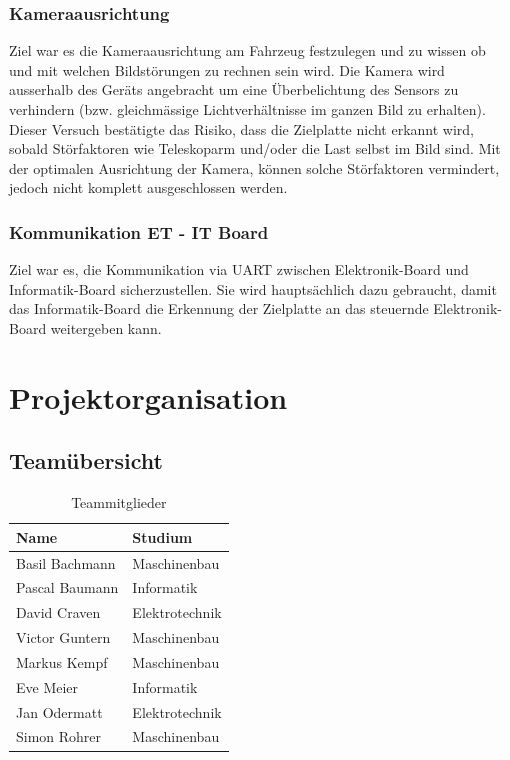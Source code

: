\documentclass[a4paper]{report}
\begin{document}
\subsection{Kameraausrichtung}
\label{ssec:VersKamera}
Ziel war es die Kameraausrichtung am Fahrzeug festzulegen und zu wissen ob und mit welchen Bildstörungen zu rechnen sein wird.
Die Kamera wird ausserhalb des Geräts angebracht um eine Überbelichtung des Sensors zu verhindern (bzw. gleichmässige Lichtverhältnisse im ganzen Bild zu erhalten).
Dieser Versuch bestätigte das Risiko, dass die Zielplatte nicht erkannt wird, sobald Störfaktoren wie Teleskoparm und/oder die Last selbst im Bild sind.  Mit der optimalen Ausrichtung der Kamera, können solche Störfaktoren vermindert, jedoch nicht komplett ausgeschlossen werden.

\subsection{Kommunikation ET - IT Board}
\label{ssec:VersKomm}
Ziel war es, die Kommunikation via UART zwischen Elektronik-Board und Informatik-Board sicherzustellen. Sie wird hauptsächlich dazu gebraucht, damit das Informatik-Board die Erkennung der Zielplatte an das steuernde Elektronik-Board weitergeben kann.


\chapter{Projektorganisation}
\label{ch:ProjektOrga}

\section{Teamübersicht}
\label{sec:Teamuebersicht}
\begin{table}[h!]
	\centering
	\begin{tabular}{|p{}|p{}|}
		\hline
		\textbf{Name} & \textbf{Studium} \\
		\hline
		Basil Bachmann & Maschinenbau \\
		\hline
		Pascal Baumann & Informatik \\
		\hline
		David Craven & Elektrotechnik \\
		\hline
		Victor Guntern & Maschinenbau \\
		\hline
		Markus Kempf & Maschinenbau \\
		\hline
		Eve Meier & Informatik \\
		\hline
		Jan Odermatt & Elektrotechnik \\
		\hline
		Simon Rohrer & Maschinenbau \\
		\hline
	\end{tabular}
	\caption{Teammitglieder}
	\label{tab:TeamMitglieder}
\end{table}
\end{document}
